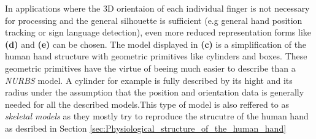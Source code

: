 In applications where the 3D orientaion of each individual finger is not necessary for processing and the general silhouette is sufficient (e.g general hand position tracking or sign language detection), even more reduced representation forms like \textbf{(d)} and \textbf{(e)} can be chosen.
The model displayed in \textbf{(c)} is a simplification of the human hand structure with geometric primitives like cylinders and boxes. These geometric primitives have the virtue of beeing much easier to describe than a \textit{NURBS} model. A cylinder for example is fully described by its hight and its radius under the assumption that the position and orientation data is generally needed for all the described models.This type of model is also reffered to as \textit{skeletal models} as they mostly try to reproduce the strucutre of the human hand as desribed in Section \ref{sec:Physiological_structure_of_the_human_hand}





